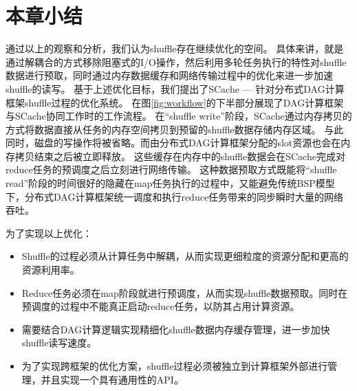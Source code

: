 \section{本章小结}
通过以上的观察和分析，我们认为shuffle存在继续优化的空间。
具体来讲，就是通过解耦合的方式移除阻塞式的I/O操作，然后利用多轮任务执行的特性对shuffle数据进行预取，同时通过内存数据缓存和网络传输过程中的优化来进一步加速shuffle的读写。
基于上述优化目标，我们提出了SCache --- 针对分布式DAG计算框架shuffle过程的优化系统。
在图\ref{fig:workflow}的下半部分展现了DAG计算框架与SCache协同工作时的工作流程。
在“shuffle write”阶段，SCache通过内存拷贝的方式将数据直接从任务的内存空间拷贝到预留的shuffle数据存储内存区域。
与此同时，磁盘的写操作将被省略。而由分布式DAG计算框架分配的slot资源也会在内存拷贝结束之后被立即释放。
这些缓存在内存中的shuffle数据会在SCache完成对reduce任务的预调度之后立刻进行网络传输。
这种数据预取方式既能将“shuffle read”阶段的时间很好的隐藏在map任务执行的过程中，又能避免传统BSP模型下，分布式DAG计算框架统一调度和执行reduce任务带来的同步瞬时大量的网络吞吐。

为了实现以上优化：
\begin{itemize}
	\item Shuffle的过程必须从计算任务中解耦，从而实现更细粒度的资源分配和更高的资源利用率。
	\item Reduce任务必须在map阶段就进行预调度，从而实现shuffle数据预取。同时在预调度的过程中不能真正启动reduce任务，以防其占用计算资源。
	\item 需要结合DAG计算逻辑实现精细化shuffle数据内存缓存管理，进一步加快shuffle读写速度。
	\item 为了实现跨框架的优化方案，shuffle过程必须被独立到计算框架外部进行管理，并且实现一个具有通用性的API。
\end{itemize}
